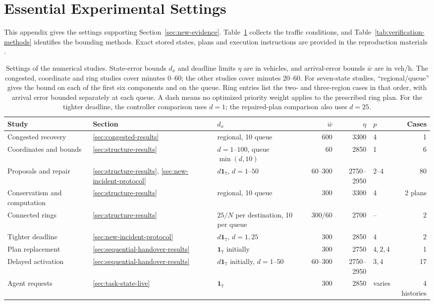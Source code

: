 \documentclass[final]{cas-sc}
\theoremstyle{definition}
\theoremstyle{plain}
\theoremstyle{definition}
\theoremstyle{plain}
\begin{document}
\section{Essential Experimental Settings}
\label{app:experimental-settings}
\label{app:reusable-benchmark}
\label{sec:supp-queue-settings}
\label{app:benchmark-details}

This appendix gives the settings supporting
Section~\ref{sec:new-evidence}. Table~\ref{tab:study-overview} collects
the traffic conditions, and Table~\ref{tab:verification-methods}
identifies the bounding methods. Exact stored states, plans and
execution instructions are provided in the reproduction materials
\cite{perimeterReproductionGuide}.

\begin{table}[pos=!htb]
\centering\footnotesize
\caption{Settings of the numerical studies. State-error bounds $d_x$ and
deadline limits $\eta$ are in vehicles, and arrival-error bounds $\bar w$
are in veh/h. The congested, coordinate and ring studies cover minutes
0--60; the other studies cover minutes 20--60. For seven-state studies,
``regional/queue'' gives the bound on each of the first six components
and on the queue. Ring entries list the two- and three-region cases in
that order, with arrival error bounded separately at each queue. A dash
means no optimized priority weight applies to the prescribed ring plan.
For the tighter deadline, the controller comparison uses $d=1$;
the repaired-plan comparison also uses $d=25$.}
\label{tab:study-overview}
\setlength{\tabcolsep}{3pt}
\begin{tabularx}{\linewidth}{@{}>{\raggedright\arraybackslash}p{2.6cm}l>{\raggedright\arraybackslash}Xrrlr@{}}
\toprule
Study & Section & $d_x$ & $\bar w$ & $\eta$ & $p$ & Cases\\
\midrule
Congested recovery & \ref{sec:congested-results} & 25 regional, 10 queue & 600 & 3300 & 4 & 1\\
Coordinates and bounds & \ref{sec:structure-results} & $d=1$--$100$, queue $\min(d,10)$ & 60 & 2850 & 1 & 6\\
Proposals and repair & \ref{sec:structure-results}, \ref{sec:new-incident-protocol} & $d\mathbf1_7$, $d=1$--$50$ & 60--300 & 2750--2950 & 2--4 & 80\\
Conservatism and computation & \ref{sec:structure-results} & 25 regional, 10 queue & 300 & 3300 & 4 & 2 plans\\
Connected rings & \ref{sec:structure-results} & $25/N$ per destination, 10 per queue & 300/60 & 2700 & -- & 2\\
Tighter deadline & \ref{sec:new-incident-protocol} & $d\mathbf1_7$, $d=1,25$ & 300 & 2850 & 4 & 2\\
Plan replacement & \ref{sec:sequential-handover-results} & $\mathbf1_7$ initially & 300 & 2750 & $4,2,4$ & 1\\
Delayed activation & \ref{sec:sequential-handover-results} & $d\mathbf1_7$ initially, $d=1$--$50$ & 60--300 & 2750--2950 & $3,4$ & 17\\
Agent requests & \ref{sec:task-state-live} & $\mathbf1_7$ & 300 & 2850 & varies & 4 histories\\
\bottomrule
\end{tabularx}
\end{table}
\end{document}
